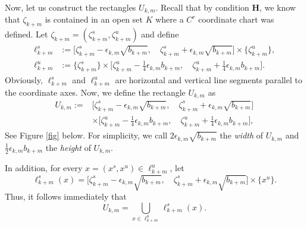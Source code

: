 \documentclass{amsart}
\theoremstyle{plain}
\theoremstyle{definition}
\theoremstyle{remark}
\numberwithin{equation}{section}
\begin{document}
Now, let us construct the rectangles $U_{k,m}$. Recall that by condition {\bf H}, we know that $\zeta_{k+m}$ is contained in an open set $K$ where a $C^r$ coordinate chart was defined.
Let $\zeta_{k+m}=(\zeta^s_{k+m}, \zeta^u_{k+m})$ and define
\begin{align*}
\ell^s_{k+m}&:=\Big[\zeta^s_{k+m}-\epsilon_{k,m}\sqrt{b_{k+m}}, \quad  \zeta^s_{k+m}+\epsilon_{k,m}\sqrt{b_{k+m}}\Big]\times\{\zeta^u_{k+m}\},
\\
\ell^u_{k+m}&:=\{\zeta^s_{k+m}\}\times\Big[\zeta^u_{k+m}-\frac{1}{4}\epsilon_{k,m}b_{k+m}, \quad  \zeta^u_{k+m}+\frac{1}{4}\epsilon_{k,m}b_{k+m}\Big].
\end{align*}
Obviously, $\ell^s_{k+m}$ and $\ell^u_{k+m}$ are horizontal and vertical line segments parallel to the coordinate axes. Now, we define the rectangle $U_{k,m}$ as
\begin{align*}
U_{k,m}:=&\Big[\zeta^s_{k+m}-\epsilon_{k,m}\sqrt{b_{k+m}}, \quad  \zeta^s_{k+m}+\epsilon_{k,m}\sqrt{b_{k+m}}\Big]\\
&\times \Big[\zeta^u_{k+m}-\frac{1}{4}\epsilon_{k,m}b_{k+m}, \quad  \zeta^u_{k+m}+\frac{1}{4}\epsilon_{k,m}b_{k+m}\Big], 
\end{align*}
See Figure \ref{fig} below. For simplicity, we call $2\epsilon_{k,m}\sqrt{b_{k+m}}$ the \emph{width} of $U_{k,m}$ and $\frac{1}{2}\epsilon_{k,m}b_{k+m}$ the \emph{height} of $U_{k,m}$.

In addition, for every $x=(x^s,x^u)\in \ell_{k+m}^u$, let 
\[\ell^s_{k+m}(x)=\Big[\zeta^s_{k+m}-\epsilon_{k,m}\sqrt{b_{k+m}}, \quad  \zeta^s_{k+m}+\epsilon_{k,m}\sqrt{b_{k+m}}\Big]\times\{x^u\}.\]
Thus, it follows immediately that
\[
U_{k,m}=\bigcup_{x\in \ell_{k+m}^u}\ell _{k+m}^s(x).
\]
\end{document}
